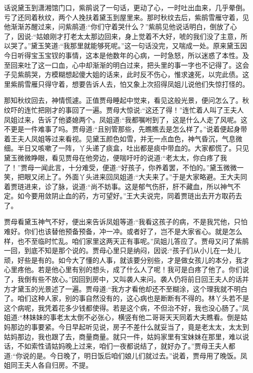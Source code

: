 


\begin{parag}
    话说黛玉到潇湘馆门口，紫鹃说了一句话，更动了心，一时吐出血来，几乎晕倒。亏了还同着秋纹，两个人挽扶着黛玉到屋里来。那时秋纹去后，紫鹃雪雁守着，见他渐渐苏醒过来，问紫鹃道:“你们守着哭什么？”紫鹃见他说话明白，倒放了心了，因说:“姑娘刚才打老太太那边回来，身上觉着不大好，唬的我们没了主意，所以哭了。”黛玉笑道:“我那里就能够死呢。”这一句话没完，又喘成一处。原来黛玉因今日听得宝玉宝钗的事情，这本是他数年的心病，一时急怒，所以迷惑了本性。及至回来吐了这一口血，心中却渐渐的明白过来，把头里的事一字也不记得了。这会子见紫鹃哭，方模糊想起傻大姐的话来，此时反不伤心，惟求速死，以完此债。这里紫鹃雪雁只得守着，想要告诉人去，怕又象上次招得凤姐儿说他们失惊打怪的。
\end{parag}


\begin{parag}
    那知秋纹回去，神情慌遽。正值贾母睡起中觉来，看见这般光景，便问怎么了。秋纹吓的连忙把刚才的事回了一遍。贾母大惊说:“这还了得！”连忙着人叫了王夫人凤姐过来，告诉了他婆媳两个。凤姐道:“我都嘱咐到了，这是什么人走了风呢。这不更是一件难事了吗。贾母道:“且别管那些，先瞧瞧去是怎么样了。”说着便起身带着王夫人凤姐等过来看视。见黛玉颜色如雪，并无一点血色，神气昏沉，气息微细。半日又咳嗽了一阵，丫头递了痰盒，吐出都是痰中带血的。大家都慌了。只见黛玉微微睁眼，看见贾母在他旁边，便喘吁吁的说道:“老太太，你白疼了我了！”贾母一闻此言，十分难受，便道:“好孩子，你养着罢，不怕的。”黛玉微微一笑，把眼又闭上了。外面丫头进来回凤姐道:“大夫来了。”于是大家略避。王大夫同着贾琏进来，诊了脉，说道:“尚不妨事。这是郁气伤肝，肝不藏血，所以神气不定。如今要用敛阴止血的药，方可望好。”王大夫说完，同着贾琏出去开方取药去了。
\end{parag}


\begin{parag}
    贾母看黛玉神气不好，便出来告诉凤姐等道:“我看这孩子的病，不是我咒他，只怕难好。你们也该替他预备预备，冲一冲。或者好了，岂不是大家省心。就是怎么样，也不至临时忙乱。咱们家里这两天正有事呢。”凤姐儿答应了。贾母又问了紫鹃一回，到底不知是那个说的。贾母心里只是纳闷，因说:“孩子们从小儿在一处儿顽，好些是有的。如今大了懂的人事，就该要分别些，才是做女孩儿的本分，我才心里疼他。若是他心里有别的想头，成了什么人了呢！我可是白疼了他了。你们说了，我倒有些不放心。”因回到房中，又叫袭人来问。袭人仍将前日回王夫人的话并方才黛玉的光景述了一遍。贾母道:“我方才看他却还不至糊涂，这个理我就不明白了。咱们这种人家，别的事自然没有的，这心病也是断断有不得的。林丫头若不是这个病呢，我凭着花多少钱都使得。若是这个病，不但治不好，我也没心肠了。”凤姐道:“林妹妹的事老太太倒不必张心，横竖有他二哥哥天天同着大夫瞧看。倒是姑妈那边的事要紧。今日早起听见说，房子不差什么就妥当了，竟是老太太，太太到姑妈那边，我也跟了去，商量商量。就只一件，姑妈家里有宝妹妹在那里，难以说话，不如索性请姑妈晚上过来，咱们一夜都说结了，就好办了。”贾母王夫人都道:“你说的是。今日晚了，明日饭后咱们娘儿们就过去。”说着，贾母用了晚饭。凤姐同王夫人各自归房。不提。
\end{parag}


